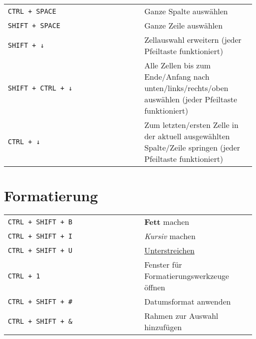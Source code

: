 \documentclass[8pt]{extarticle} %
\begin{document}
\begin{multicols}{2}
  \begin{tabular}{L{0.55\linewidth} L{0.45\linewidth}}

    \tt CTRL + SPACE            & Ganze Spalte auswählen \\
    \tt SHIFT + SPACE           & Ganze Zeile auswählen \\
    \tt SHIFT + ↓               & Zellauswahl erweitern (jeder Pfeiltaste funktioniert) \\
    \tt SHIFT + CTRL + ↓        & Alle Zellen bis zum Ende/Anfang nach unten/links/rechts/oben auswählen (jeder Pfeiltaste funktioniert) \\
    \tt CTRL + ↓                & Zum letzten/ersten Zelle in der aktuell ausgewählten Spalte/Zeile springen (jeder Pfeiltaste funktioniert) \\

  \end{tabular}


\section{Formatierung}

  \begin{tabular}{L{0.55\linewidth} L{0.45\linewidth}}
    
    \tt CTRL + SHIFT + B        & \textbf{Fett} machen \\
    \tt CTRL + SHIFT + I        & \textit{Kursiv} machen \\
    \tt CTRL + SHIFT + U        & \underline{Unterstreichen} \\
    \tt CTRL + 1                & Fenster für Formatierungswerkzeuge öffnen \\
    \tt CTRL + SHIFT + \#       & Datumsformat anwenden \\
    \tt CTRL + SHIFT + \&       & Rahmen zur Auswahl hinzufügen \\
    
  \end{tabular}


\end{multicols}
\end{document}
